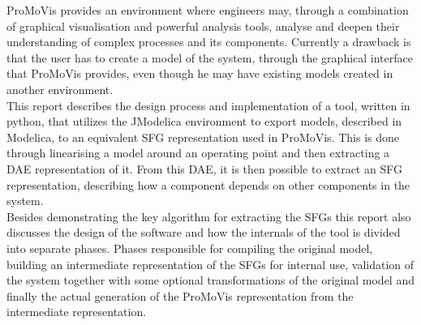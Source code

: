 ProMoVis provides an environment where engineers may, through a combination of graphical visualisation and powerful analysis tools, analyse and deepen their understanding of complex processes and its components. Currently a drawback is that the user has to create a model of the system, through the graphical interface that ProMoVis provides, even though he may have existing models created in another environment.\\\newline This report describes the design process and implementation of a tool, written in python, that utilizes the JModelica environment to export models, described in Modelica, to an equivalent SFG representation used in ProMoVis. This is done through linearising a model around an operating point and then extracting a DAE representation of it. From this DAE, it is then possible to extract an SFG representation, describing how a component depends on other components in the system.\\\newline Besides demonstrating the key algorithm for extracting the SFGs this report also discusses the design of the software and how the internals of the tool is divided into separate phases. Phases responsible for compiling the original model, building an intermediate representation of the SFGs for internal use, validation of the system together with some optional transformations of the original model and finally the actual generation of the ProMoVis representation from the intermediate representation. 
